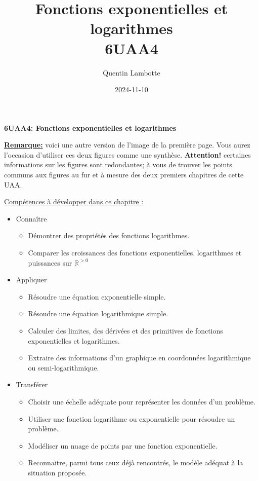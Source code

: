 \documentclass[a4paper,12pt,singlepage]{report}
\author{Quentin Lambotte}
\date{2024-11-10}
\title{Fonctions exponentielles et logarithmes\\\medskip
\large 6UAA4}
\newcommand{\IR}{\mathbb{R}}
\begin{document}
\begin{titlepage}
\begin{center}
\vspace{2cm}
\Huge
\textbf{6UAA4: Fonctions exponentielles et logarithmes}
\vspace{2cm}

\begin{center}

\end{center}
\end{center}
\end{titlepage}



\singlespacing
\small

\uline{\textbf{Remarque:}} voici une autre version de l'image de la première page. Vous aurez
l'occasion d'utiliser ces deux figures comme une synthèse. \textbf{Attention!}
certaines informations sur les figures sont redondantes; à vous de trouver les
points communs aux figures au fur et à mesure des deux premiers chapitres de
cette UAA.
\begin{center}

\end{center}

\uline{Compétences à développer dans ce chapitre :}
\begin{itemize}
\item Connaître
\begin{itemize}
\item Démontrer des propriétés des fonctions logarithmes.
\item Comparer les croissances des fonctions exponentielles, logarithmes et
puissances sur \(\IR^{>0}\)
\end{itemize}
\item Appliquer
\begin{itemize}
\item Résoudre une équation exponentielle simple.
\item Résoudre une équation logarithmique simple.
\item Calculer des limites, des dérivées et des primitives de fonctions
exponentielles et logarithmes.
\item Extraire des informations d’un graphique en coordonnées logarithmique ou
semi-logarithmique.
\end{itemize}
\item Transférer
\begin{itemize}
\item Choisir une échelle adéquate pour représenter les données d’un problème.
\item Utiliser une fonction logarithme ou exponentielle pour résoudre un problème.
\item Modéliser un nuage de points par une fonction exponentielle.
\item Reconnaitre, parmi tous ceux déjà rencontrés, le modèle adéquat à la
situation proposée.
\end{itemize}
\end{itemize}
\onehalfspacing
\end{document}
